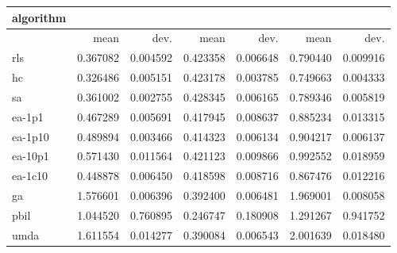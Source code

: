 \begin{tabular}{@{}l*{6}{>{{}}N{1}{2}}@{}}
\toprule
{algorithm} &  &  &  \\
\midrule
& {mean} & {dev.} & {mean} & {dev.} & {mean} & {dev.} \\
\midrule
rls & 0.367082 & 0.004592 & 0.423358 & 0.006648 & 0.790440 & 0.009916 \\
 hc & 0.326486 & 0.005151 & 0.423178 & 0.003785 & 0.749663 & 0.004333 \\
 sa & 0.361002 & 0.002755 & 0.428345 & 0.006165 & 0.789346 & 0.005819 \\
 ea-1p1 & 0.467289 & 0.005691 & 0.417945 & 0.008637 & 0.885234 & 0.013315 \\
 ea-1p10 & 0.489894 & 0.003466 & 0.414323 & 0.006134 & 0.904217 & 0.006137 \\
 ea-10p1 & 0.571430 & 0.011564 & 0.421123 & 0.009866 & 0.992552 & 0.018959 \\
 ea-1c10 & 0.448878 & 0.006450 & 0.418598 & 0.008716 & 0.867476 & 0.012216 \\
 ga & 1.576601 & 0.006396 & 0.392400 & 0.006481 & 1.969001 & 0.008058 \\
 pbil & 1.044520 & 0.760895 & 0.246747 & 0.180908 & 1.291267 & 0.941752 \\
 umda & 1.611554 & 0.014277 & 0.390084 & 0.006543 & 2.001639 & 0.018480 \\
 \bottomrule
\end{tabular}
